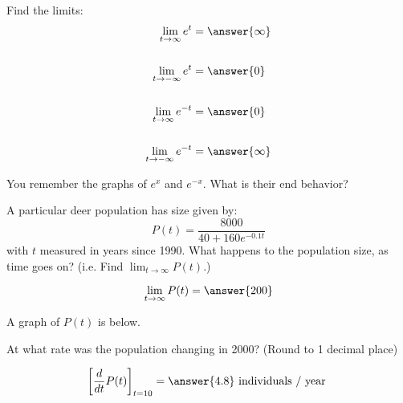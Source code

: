 \documentclass{ximera}
\author{Bobby Ramsey}
\begin{document}
\begin{exercise}

	Find the limits:
	\begin{align*}
		\lim_{t\to \infty} e^t &= \answer{\infty}\\
		\\
		\lim_{t \to -\infty} e^t &= \answer{0}\\
		\\
		\lim_{t\to \infty} e^{-t} &= \answer{0}\\
		\\
		\lim_{t \to -\infty} e^{-t} &= \answer{\infty}
	\end{align*}
	\begin{hint}
		You remember the graphs of $e^x$ and $e^{-x}$.  What is their end behavior?
	\end{hint}

	\begin{exercise}
	A particular deer population has size given by:
	\[ P(t) = \frac{8000}{40+160e^{-0.1t}} \]
	with $t$ measured in years since 1990.
	What happens to the population size, as time goes on? (i.e. Find $\displaystyle \lim_{t\to\infty}P(t)$.)
		
	\[ \lim_{t\to\infty} P(t) = \answer{200} \]
	
		\begin{exercise}
		
			A graph of $P(t)$ is below.
			

		At what rate was the population changing in 2000? (Round to 1 decimal place)
		
		\[ \eval{ \ddt{P(t)} }_{t=10} = \answer{4.8} \text{ individuals / year } \]	
	
		\end{exercise}
	\end{exercise}


\end{exercise}
\end{document}
